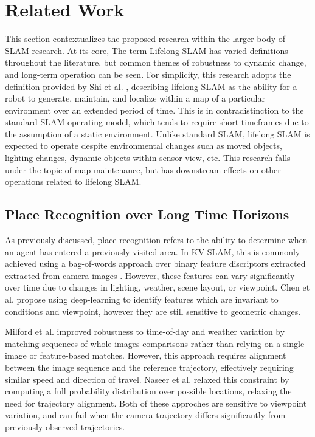 \section{Related Work}
\label{sec:related_work}

This section contextualizes the proposed research within the larger body of SLAM research. At its core, 
The term Lifelong SLAM has varied definitions throughout the literature, but common themes of robustness to dynamic change, and long-term operation can be seen. For simplicity, this research adopts the definition provided by Shi et al. \cite{shiAreWeReady2020}, describing lifelong SLAM as the ability for a robot to generate, maintain, and localize within a map of a particular environment over an extended period of time. This is in contradistinction to the standard SLAM operating model, which tends to require short timeframes due to the assumption of a static environment. Unlike standard SLAM, lifelong SLAM is expected to operate despite environmental changes such as moved objects, lighting changes, dynamic objects within sensor view, etc. This research falls under the topic of map maintenance, but has downstream effects on other operations related to lifelong SLAM.

\subsection{Place Recognition over Long Time Horizons}

As previously discussed, place recognition refers to the ability to determine when an agent has entered a previously visited area. In KV-SLAM, this is commonly achieved using a bag-of-words approach over binary feature discriptors extracted extracted from camera images \cite{camposORBSLAM3AccurateOpenSource2021}. However, these features can vary significantly over time due to changes in lighting, weather, scene layout, or viewpoint. Chen et al. \cite{chenDeepLearningFeatures2017} propose using deep-learning to identify features which are invariant to conditions and viewpoint, however they are still sensitive to geometric changes.

Milford et al. improved robustness to time-of-day and weather variation by matching sequences of whole-images comparisons rather than relying on a single image or feature-based matches. However, this approach requires alignment between the image sequence and the reference trajectory, effectively requiring similar speed and direction of travel. Naseer et al. \cite{naseerVisionbasedMarkovLocalization2015} relaxed this constraint by computing a full probability distribution over possible locations, relaxing the need for trajectory alignment. Both of these approches are sensitive to viewpoint variation, and can fail when the camera trajectory differs significantly from previously observed trajectories.

